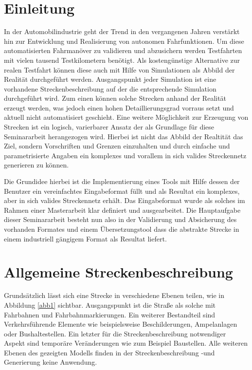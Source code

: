 
\chapter{Einleitung}

In der Automobilindustrie geht der Trend in den vergangenen Jahren verstärkt hin zur Entwicklung und Realisierung von autonomen Fahrfunktionen. Um diese automatisierten Fahrmanöver zu validieren und abzusichern werden Testfahrten mit vielen tausend Testkilometern benötigt. Als kostengünstige Alternative zur realen Testfahrt können diese auch mit Hilfe von Simulationen als Abbild der Realität durchgeführt werden. Ausgangspunkt jeder Simulation ist eine vorhandene Streckenbeschreibung auf der die entsprechende Simulation durchgeführt wird. Zum einen können solche Strecken anhand der Realität erzeugt werden, was jedoch einen hohen Detaillierungsgrad vorraus setzt und aktuell nicht automatisiert geschieht. Eine weitere Möglichkeit zur Erzeugung von Strecken ist ein logisch, varierbarer Ansatz der als Grundlage für diese Seminararbeit herangezogen wird. Hierbei ist nicht das Abbild der Realtität das Ziel, sondern Vorschriften und Grenzen einzuhalten und durch einfache und parametrisierte Angaben ein komplexes und vorallem in sich valides Streckennetz generieren zu können.

Die Grundidee hierbei ist die Implementierung eines Tools mit Hilfe dessen der Benutzer ein vereinfachtes Eingabeformat füllt und als Resultat ein komplexes, aber in sich valides Streckennetz erhält. Das Eingabeformat wurde als solches im Rahmen einer Masterarbeit klar definiert und ausgearbeitet. Die Hauptaufgabe dieser Seminararbeit besteht nun also in der Validierung und Absicherung des vorhanden Formates und einem Übersetzungstool dass die abstrakte Strecke in einem industriell gängigem Format als Resultat liefert.

\chapter{Allgemeine Streckenbeschreibung}
Grundsätzlich lässt sich eine Strecke in verschiedene Ebenen teilen, wie in Abbildung \ref{abb1} sichtbar. Ausgangspunkt ist die Straße als solche mit Fahrbahnen und Fahrbahnmarkierungen. Ein weiterer Bestandteil sind Verkehrsführende Elemente wie beispielsweise Beschilderungen, Ampelanlagen oder Bushaltestellen. Ein letzter für die Streckenbeschreibung notwendiger Aspekt sind temporäre Veränderungen wie zum Beispiel Baustellen. Alle weiteren Ebenen des gezeigten Modells finden in der Streckenbeschreibung -und Generierung keine Anwendung.

